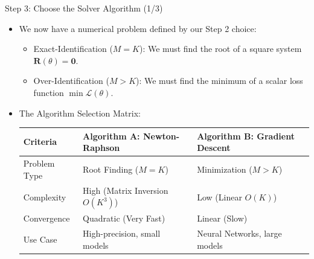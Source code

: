 \documentclass[aspectratio=169]{beamer}
\newcommand{\1}{\mathbf{1}}
\begin{document}
\begin{frame}{Step 3: Choose the Solver Algorithm (1/3)}
    \small
        \begin{itemize}
        \item We now have a numerical problem defined by our Step 2 choice:
        \begin{itemize}
            \item Exact-Identification ($M = K$): We must find the root of a square system $\mathbf{R}(\theta) = \mathbf{0}$.
            \item Over-Identification ($M > K$): We must find the minimum of a scalar loss function $\min \mathcal{L}(\theta)$.
        \end{itemize}
        
        \item The Algorithm Selection Matrix:
        \begin{table}
        \centering
        \begin{tabular}{l|l|l}
        Criteria & Algorithm A: Newton-Raphson & Algorithm B: Gradient Descent \\ \hline
        Problem Type & Root Finding ($M=K$) & Minimization ($M > K$) \\
        Complexity & High (Matrix Inversion $O(K^3)$) & Low (Linear $O(K)$) \\
        Convergence & Quadratic (Very Fast) & Linear (Slow) \\
        Use Case & High-precision, small models & Neural Networks, large models \\
        \end{tabular}
        \end{table}
        \end{itemize}
    \end{frame}
    
\end{document}
